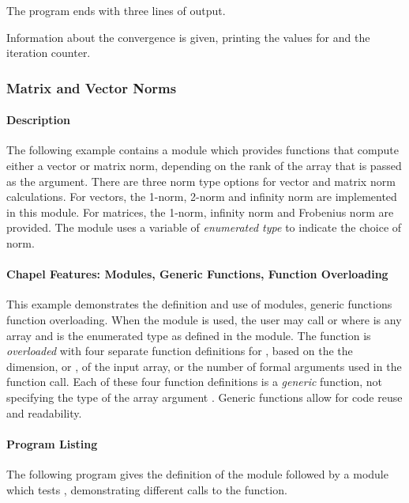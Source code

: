 The program ends with three lines of output.
\begin{chapel}
  writeln("Jacobi computation complete.");  
  writeln("Delta is ", delta, " (< epsilon = ", epsilon, ")");
  writeln("# of iterations: ", iteration); 
}
\end{chapel}
Information about the convergence is given, printing the values
for  and the iteration counter.

\subsubsection{Matrix and Vector Norms}

\paragraph{Description}
The following example contains a module  which provides  
 functions that compute either a vector or matrix norm, depending
on the rank of the array that is passed as the argument.  There are three
norm type options for vector and matrix norm calculations.  For vectors,  
the 1-norm, 2-norm and infinity norm are implemented in this module.  
For matrices, the 1-norm, infinity norm and Frobenius norm are provided.   
The module uses a variable of {\em enumerated type}  to 
indicate the choice of norm.

\paragraph{Chapel Features:  Modules, Generic Functions, Function Overloading}
This example demonstrates the definition and use of modules, generic functions
function overloading.
When the  module is used, the user may call 
 or  where
 is any array and  is the enumerated type as defined
in the  module.  The  function is {\em overloaded} with
four separate function definitions for , based on the
the dimension, or , of the input array, or the number of formal
arguments used in the  function call.  Each of these four function
definitions is a {\em generic} function, not specifying the type of the array
argument .  Generic functions allow for code reuse and readability.

\paragraph{Program Listing}
The following program gives the definition of the  module followed
by a module which tests , demonstrating different calls to the 
function.

